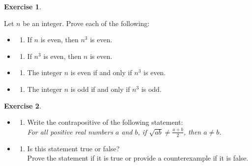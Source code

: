 \documentclass[
]{book}
\providecommand{\tightlist}{%
  \setlength{\itemsep}{0pt}\setlength{\parskip}{0pt}}
\theoremstyle{definition}
\theoremstyle{definition}
\theoremstyle{definition}
\newtheorem{exercise}{Exercise}[chapter]
\theoremstyle{definition}
\theoremstyle{remark}
\begin{document}
\begin{exercise}
\protect\hypertarget{exr:unnamed-chunk-142}{}\label{exr:unnamed-chunk-142}

Let \(n\) be an integer. Prove each of the following:

\begin{itemize}
\tightlist
\item
  \begin{enumerate}
  \def\labelenumi{(\alph{enumi})}
  \tightlist
  \item
    If \(n\) is even, then \(n^3\) is even.
  \end{enumerate}
\item
  \begin{enumerate}
  \def\labelenumi{(\alph{enumi})}
  \setcounter{enumi}{1}
  \tightlist
  \item
    If \(n^3\) is even, then \(n\) is even.
  \end{enumerate}
\item
  \begin{enumerate}
  \def\labelenumi{(\alph{enumi})}
  \setcounter{enumi}{2}
  \tightlist
  \item
    The integer \(n\) is even if and only if \(n^3\) is even.
  \end{enumerate}
\item
  \begin{enumerate}
  \def\labelenumi{(\alph{enumi})}
  \setcounter{enumi}{3}
  \tightlist
  \item
    The integer \(n\) is odd if and only if \(n^3\) is odd.
  \end{enumerate}
\end{itemize}

\end{exercise}

\begin{exercise}
\protect\hypertarget{exr:unnamed-chunk-143}{}\label{exr:unnamed-chunk-143}\leavevmode

\begin{itemize}
\tightlist
\item
  \begin{enumerate}
  \def\labelenumi{(\alph{enumi})}
  \tightlist
  \item
    Write the contrapositive of the following statement:\\
    \emph{For all positive real numbers \(a\) and \(b\), if \(\sqrt{ab} \neq \frac{a + b}{2}\), then \(a \neq b\).}
  \end{enumerate}
\item
  \begin{enumerate}
  \def\labelenumi{(\alph{enumi})}
  \setcounter{enumi}{1}
  \tightlist
  \item
    Is this statement true or false?\\
    Prove the statement if it is true or provide a counterexample if it is false.
  \end{enumerate}
\end{itemize}

\end{exercise}
\end{document}
